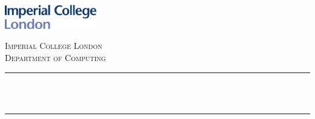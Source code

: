 \begin{titlepage}

\newcommand{\HRule}{\rule{\linewidth}{0.5mm}} %



\includegraphics[width = 4cm]{./figures/imperial}\\[0.5cm] 

\center %


\textsc{\Large Imperial College London}\\[0.5cm] 
\textsc{\large Department of Computing}\\[0.5cm] 


\HRule \\[0.4cm]
{ \huge \bfseries \reporttitle}\\ %
\HRule \\[1.5cm]
 


\end{titlepage}
